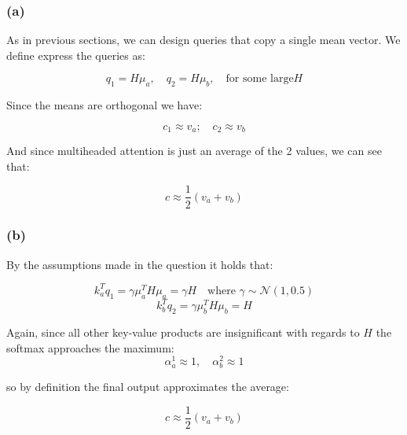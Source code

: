 \subsubsection*{(a)}
As in previous sections, we can design queries that copy a single mean vector. We define express the queries as:
    
$$ q_1=H \mu_a,\quad q_2=H \mu_b,\quad \text{for some large} H$$

Since the means are orthogonal we have:

$$ c_1\approx v_a;\quad c_2\approx v_b$$

And since multiheaded attention is just an average of the 2 values, we can see that:

$$ c\approx\frac{1}{2}(v_a+v_b)$$

\subsubsection*{(b)}

By the assumptions made in the question it holds that:

$$ k_a^Tq_1 = \gamma \mu_a^TH\mu_a = \gamma H \quad \text{where } \gamma \sim \mathcal{N}\left(1, 0.5\right) $$
$$ k_b^Tq_2 = \gamma \mu_b^TH\mu_b = H $$

Again, since all other key-value products are insignificant with regards to $H$ the softmax approaches the maximum:
$$ \alpha^1_a \approx 1, \quad \alpha^2_b \approx 1 $$

so by definition the final output approximates the average:

$$ c \approx \frac{1}{2}\left(v_a + v_b\right)$$